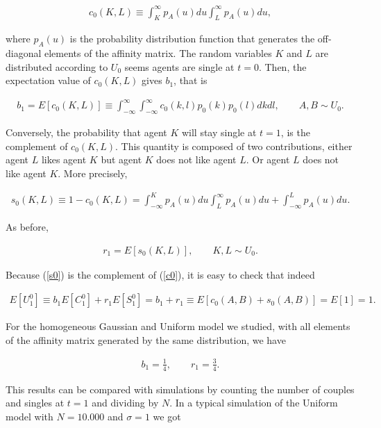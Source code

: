 \documentclass[12pt]{article}
\begin{document}
\begin{align}
    c_0(K,L)\equiv\int_K^\infty p_A(u)du\int_L^\infty p_A(u)du,
    \label{c0}
\end{align}

\noindent where $p_A(u)$ is the probability distribution function that generates the off-diagonal elements of the affinity matrix.  The random variables $K$ and $L$ are distributed according to $U_0$ seems agents are single at $t=0$. Then, the expectation value of $c_0(K,L)$ gives $b_1$, that is

\begin{align}
    b_1=E[c_0(K,L)]\equiv\int_{-\infty}^\infty\int_{-\infty}^\infty c_0(k,l)p_0(k)p_0(l)dkdl,\qquad A,B\sim U_0.
    \label{b1}
\end{align}

Conversely, the probability that agent $K$ will stay single at $t=1$, is the complement of $c_0(K,L)$. This quantity is composed of two contributions, either agent $L$ likes agent $K$ but agent $K$ does not like agent $L$. Or agent $L$ does not like agent $K$. More precisely,

\begin{align}
    s_0(K,L)\equiv1-c_0(K,L)=\int_{-\infty}^Kp_A(u)du\int_L^\infty p_A(u)du+\int_{-\infty}^Lp_A(u)du.
    \label{s0}
\end{align}

\noindent As before,

\begin{align}
    r_1=E[s_0(K,L)],\qquad K,L\sim U_0.
    \label{r1}
\end{align}

Because (\ref{s0}) is the complement of (\ref{c0}), it is easy to check that indeed

\begin{align}
    E[U_1^0]\equiv b_1E[C_1^0]+r_1E[S_1^0]=b_1+r_1\equiv E[c_0(A,B)+s_0(A,B)]=E[1]=1.
\end{align}

\noindent For the homogeneous Gaussian and Uniform model we studied, with all elements of the affinity matrix generated by the same distribution, we have

\begin{align}
    b_1=\frac{1}{4},\qquad r_1=\frac{3}{4}.
    \label{b1r1}
\end{align}

\noindent This results can be compared with simulations by counting the number of couples and singles at $t=1$ and dividing by $N$. In a typical simulation of the Uniform model with $N=10.000$ and $\sigma=1$ we got
\end{document}
